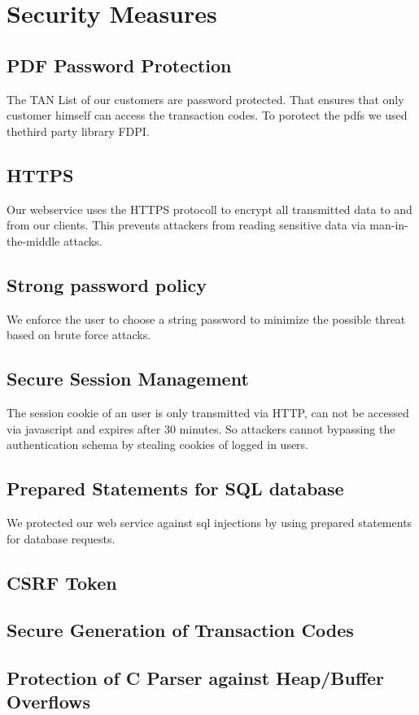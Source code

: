 \chapter{Security Measures}

\section{PDF Password Protection}
The TAN List of our customers are password protected. That ensures that only customer himself can access the transaction codes. To porotect the pdfs we used thethird party library FDPI.
\section{HTTPS}
Our webservice uses the HTTPS protocoll to encrypt all transmitted data to and from our clients.
This prevents attackers from reading sensitive data via man-in-the-middle attacks.
\section{Strong password policy}
We enforce the user to choose a string password to minimize the possible threat based on brute force attacks.
\section{Secure Session Management}
The session cookie of an user is only transmitted via HTTP, can not be accessed via javascript and expires after 30 minutes. So attackers cannot bypassing the authentication schema by stealing cookies of logged in users.
\section{Prepared Statements for SQL database}
We protected our web service against sql injections by using prepared statements for database requests.
\section{CSRF Token}
\section{Secure Generation of Transaction Codes}
\section{Protection of C Parser against Heap/Buffer Overflows}
